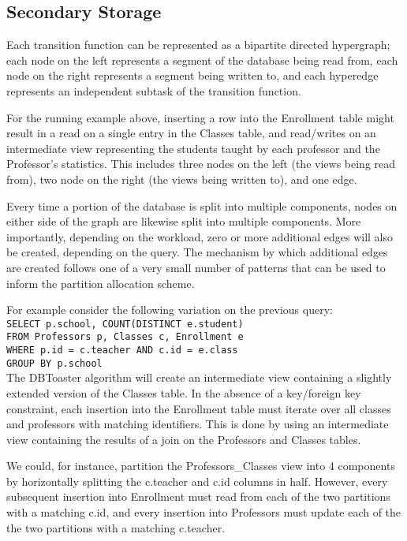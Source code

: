 \subsection{Secondary Storage}
Each transition function can be represented as a bipartite directed hypergraph; each node on the left represents a segment of the database being read from, each node on the right represents a segment being written to, and each hyperedge represents an independent subtask of the transition function.

For the running example above, inserting a row into the Enrollment table might result in a read on a single entry in the Classes table, and read/writes on an intermediate view representing the students taught by each professor and the Professor's statistics.  This includes three nodes on the left (the views being read from), two node on the right (the views being written to), and one edge.

Every time a portion of the database is split into multiple components, nodes on either side of the graph are likewise split into multiple components.  More importantly, depending on the workload, zero or more additional edges will also be created, depending on the query.  The mechanism by which additional edges are created follows one of a very small number of patterns that can be used to inform the partition allocation scheme.  

For example consider the following variation on the previous query:\texttt{\\
SELECT p.school, COUNT(DISTINCT e.student)\\
FROM Professors p, Classes c, Enrollment e\\
WHERE p.id = c.teacher AND c.id = e.class\\
GROUP BY p.school\\
}
The DBToaster algorithm will create an intermediate view containing a slightly extended version of the Classes table.  In the absence of a key/foreign key constraint, each insertion into the Enrollment table must iterate over all classes and professors with matching identifiers.  This is done by using an intermediate view containing the results of a join on the Professors and Classes tables.  

We could, for instance, partition the Professors\_Classes view into 4 components by horizontally splitting the c.teacher and c.id columns in half.  However, every subsequent insertion into Enrollment must read from each of the two partitions with a matching c.id, and every insertion into Professors must update each of the the two partitions with a matching c.teacher.  

